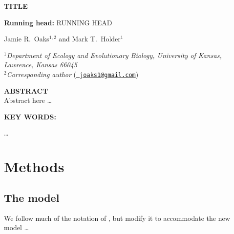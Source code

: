 \documentclass[letterpaper,12pt]{article}
\begin{document}
\doublespacing
\raggedright
\setlength{\parindent}{0.5in}
\begin{linenumbers}

\begin{titlepage}
    \begin{flushleft}
        \sffamily

        \MakeUppercase{\large\bfseries Title}

        \vspace{12pt}
        \textbf{Running head:} \MakeUppercase{Running head}

        \vspace{12pt}
        Jamie R.\ Oaks$^{1,2}$ and Mark T.\ Holder$^{1}$

        \bigskip
        $^1$\emph{Department of Ecology and Evolutionary Biology,
            University of Kansas,
            Lawrence, Kansas 66045}\\[.1in]
        $^2$\emph{Corresponding author} (\href{mailto:joaks1@gmail.com}{\tt
        joaks1@gmail.com})\\

    \end{flushleft}
\end{titlepage}

{\sffamily
    \noindent\textbf{ABSTRACT} \\
    \noindent Abstract here \ldots

    \vspace{12pt}
    \noindent\textbf{KEY WORDS: } 
}

\newpage
\noindent \ldots

\section*{Methods}

\subsection*{The model}
We follow much of the notation of \citet{Oaks2012}, but modify it to
accommodate the new model \ldots


\end{linenumbers}
\end{document}
